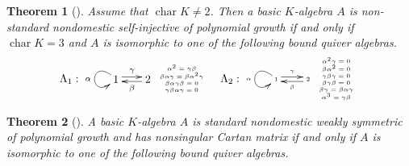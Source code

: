 \documentclass[12pt]{amsart}
\newtheorem{thm}{Theorem}[section]
\numberwithin{equation}{thm}
\newcommand\cha{\operatorname{char}}
\begin{document}
{\begin{thm}[{\cite[Theorem, Theorem]{S}}]
\label{P theorem nonstandard nondomestic}
Assume that $\cha K\neq 2$. Then
a basic $K$-algebra $A$ is non-standard nondomestic self-injective of polynomial
 growth if and only if $\cha K=3$ and $A$ is isomorphic to one of the following bound quiver algebras.
\[\Lambda_1:
\begin{xy}
(0,0) *[o]+{1}="A", (10,0) *[o]+{2}="B",
\ar @(lu,ld) "A";"A"_{\alpha}
\ar @<2pt> "A";"B"^{\gamma}
\ar @<2pt> "B";"A"^{\beta}
\end{xy}
\tiny{ \begin{array}{c}
  \alpha^2=\gamma\beta \\
 \beta\alpha\gamma=\beta\alpha^2\gamma \\
 \beta\alpha\gamma\beta=0\\
 \gamma\beta\alpha\gamma=0\\
\end{array}
}
\hspace{10pt}
\Lambda_2:
\begin{xy}
(0,0) *[o]+{1}="A", (10,0) *[o]+{2}="B",
\ar @(lu,ld) "A";"A"_{\alpha}
\ar @<2pt> "A";"B"^{\gamma}
\ar @<2pt> "B";"A"^{\beta}
\end{xy}
\tiny{ \begin{array}{c}
  \alpha^2\gamma=0 \\
  \beta\alpha^2=0\\
  \gamma\beta\gamma=0\\
  \beta\gamma\beta=0\\
   \beta\gamma=\beta\alpha\gamma \\
   \alpha^3=\gamma\beta\\
\end{array}
}
\] 

\end{thm}


\begin{thm}[{\cite[Theorem, Theorem]{S}}]
\label{P theorem standard nondomestic}
A basic $K$-algebra $A$ is standard nondomestic weakly symmetric of polynomial growth and has 
 nonsingular Cartan matrix if and only if $A$ is isomorphic to one of the following bound quiver algebras.


\[\begin{array}{c}


\end{array}\]
\end{thm}}
\end{document}
